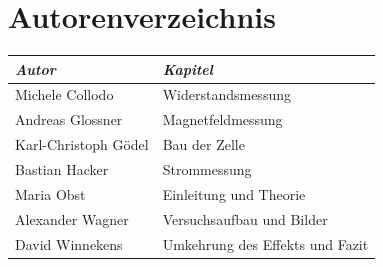 \documentclass[11pt]{scrartcl}
\begin{document}
\section{Autorenverzeichnis}
\begin{tabular}{|l|l|}
\hline
\emph{Autor} & \emph{Kapitel}\\
\hline
Michele Collodo & Widerstandsmessung\\
Andreas Glossner & Magnetfeldmessung\\
Karl-Christoph G\"odel & Bau der Zelle\\
Bastian Hacker & Strommessung\\
Maria Obst & Einleitung und Theorie\\
Alexander Wagner & Versuchsaufbau und Bilder\\
David Winnekens & Umkehrung des Effekts und Fazit\\
\hline
\end{tabular}
\end{document}
